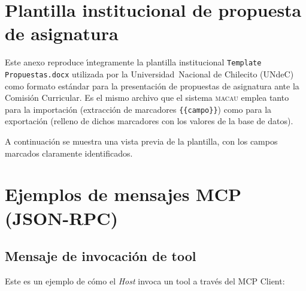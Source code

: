 \chapter{Plantilla institucional de propuesta de asignatura}
\label{anexo:plantilla_docx}

Este anexo reproduce \'{\i}ntegramente la plantilla institucional
\texttt{Template\,Propuestas.docx} utilizada por la Universidad~Nacional de
Chilecito (UNdeC) como formato est\'{a}ndar para la presentaci\'{o}n de
propuestas de asignatura ante la Comisi\'{o}n Curricular.
Es el mismo archivo que el sistema \textsc{macau} emplea tanto para la
importaci\'{o}n (extracci\'{o}n de marcadores \texttt{\{\{campo\}\}}) como para
la exportaci\'{o}n (relleno de dichos marcadores con los valores de la base
de datos).

A continuación se muestra una vista previa de la plantilla, con los campos marcados claramente identificados.



\chapter{Ejemplos de mensajes MCP (JSON-RPC)}
\label{anexo:mcp_ejemplos}

%
%
%
%

\section*{Mensaje de invocación de tool}

Este es un ejemplo de cómo el \textit{Host} invoca un tool a través del MCP Client:


